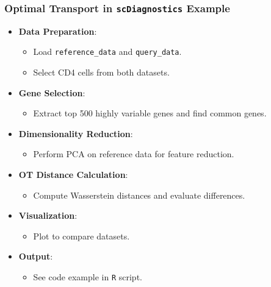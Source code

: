 \documentclass{beamer}
\begin{document}
			\begin{frame}
				\frametitle{Optimal Transport in \texttt{scDiagnostics} Example}
				\begin{itemize}
					\item \textbf{Data Preparation}:
					\begin{itemize}
						\item Load \texttt{reference\_data} and \texttt{query\_data}.
						\item Select CD4 cells from both datasets.
					\end{itemize}
					
					\item \textbf{Gene Selection}:
					\begin{itemize}
						\item Extract top 500 highly variable genes and find common genes.
					\end{itemize}
					
					\item \textbf{Dimensionality Reduction}:
					\begin{itemize}
						\item Perform PCA on reference data for feature reduction.
					\end{itemize}
					
					\item \textbf{OT Distance Calculation}:
					\begin{itemize}
						\item Compute Wasserstein distances and evaluate differences.
					\end{itemize}
					
					\item \textbf{Visualization}:
					\begin{itemize}
						\item Plot to compare datasets.
					\end{itemize}
					
					\item \textbf{Output}:
					\begin{itemize}
						\item See code example in \texttt{R} script.
					\end{itemize}
				\end{itemize}
			\end{frame}
			
	
\end{document}
